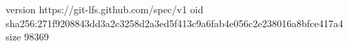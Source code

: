 version https://git-lfs.github.com/spec/v1
oid sha256:271f9208843dd3a2c3258d2a3ed5f413c9a6fab4e056c2e238016a8bfce417a4
size 98369
